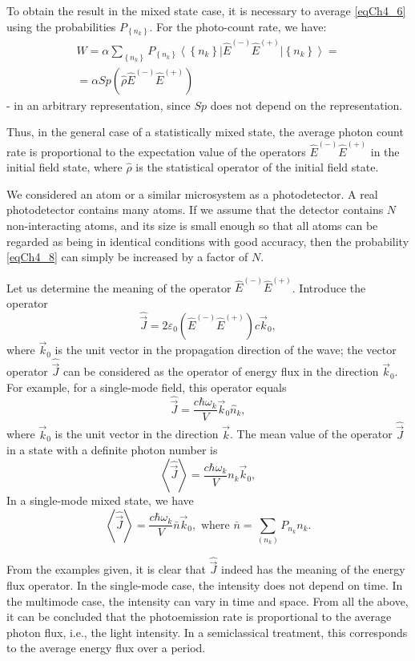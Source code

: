 To obtain the result in the mixed state case, it is necessary to average \eqref{eqCh4_6} using the probabilities  $P_{\left\{n_k\right\}}$. For the photo-count rate, we have:
\begin{eqnarray}
W = \alpha \sum_{\left\{n_k\right\}}P_{\left\{n_k\right\}}
\left<\left\{n_k\right\}\right|\hat{E}^{(-)}\hat{E}^{(+)}\left|\left\{n_k\right\}\right> =
\nonumber \\
=
\alpha Sp\left(\hat{\rho}\hat{E}^{(-)}\hat{E}^{(+)}\right)
\label{eqCh4_8}
\end{eqnarray}
- in an arbitrary representation, since $Sp$ does not depend on the representation.

Thus, in the general case of a statistically mixed state, the average photon count rate is proportional to the expectation value of the operators $\hat{E}^{(-)}\hat{E}^{(+)}$ in the initial field state, where $\hat{\rho}$ is the statistical operator of the initial field state.  

We considered an atom or a similar microsystem as a photodetector. A real photodetector contains many atoms. If we assume that the detector contains $N$ non-interacting atoms, and its size is small enough so that all atoms can be regarded as being in identical conditions with good accuracy, then the probability \eqref{eqCh4_8} can simply be increased by a factor of $N$. 

Let us determine the meaning of the operator $\hat{E}^{(-)}\hat{E}^{(+)}$.
Introduce the operator
\begin{equation}
\hat{\vec{J}} = 2 \varepsilon_0
\left(\hat{E}^{(-)}\hat{E}^{(+)}\right) c \vec{k}_0,
\label{eqCh4_9}
\end{equation}
where $\vec{k}_0$ is the unit vector in the propagation direction of the wave; the vector operator
$\hat{\vec{J}}$ can be considered as the operator of energy flux in the direction $\vec{k}_0$. For example, for a single-mode field, this operator equals
\begin{equation}
\hat{\vec{J}} = \frac{c \hbar \omega_k}{V} \vec{k}_0 \hat{n}_k,
\label{eqCh4_10}
\end{equation}
where $\vec{k}_0$ is the unit vector in the direction $\vec{k}$. The mean
value of the operator $\hat{\vec{J}}$ in a state with a definite photon number is
\[
\left<\hat{\vec{J}}\right> = \frac{c \hbar \omega_k}{V} n_k \vec{k}_0,
\]
In a single-mode mixed state, we have
\[
\left<\hat{\vec{J}}\right> = \frac{c \hbar \omega_k}{V} \bar{n} \vec{k}_0,   \mbox{ where }   \bar{n} = \sum_{(n_k)}P_{n_k} n_k.
\]

From the examples given, it is clear that $\hat{\vec{J}}$ indeed has the meaning of the energy flux operator. In the single-mode case, the intensity does not depend on time. In the multimode case, the intensity can vary in time and space. From all the above, it can be concluded that the photoemission rate is proportional to the average photon flux, i.e., the light intensity. In a semiclassical treatment, this corresponds to the average energy flux over a period. 
